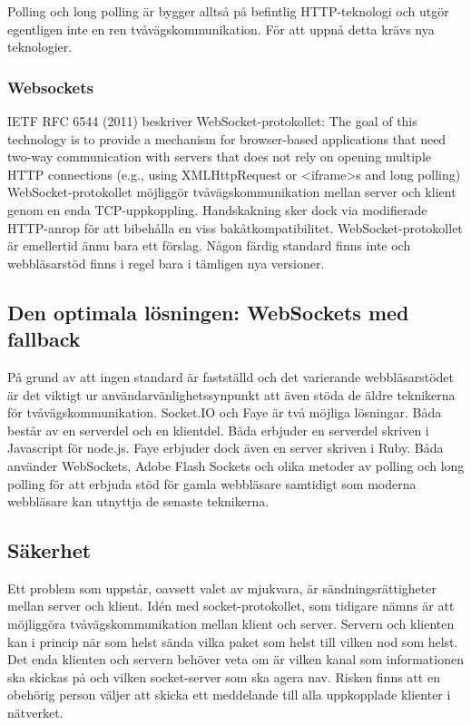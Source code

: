 Polling och long polling är bygger alltså på befintlig HTTP-teknologi och utgör egentligen inte en ren tvåvägskommunikation. För att uppnå detta krävs nya teknologier.

\subsubsection{Websockets}
IETF RFC 6544 (2011) beskriver WebSocket-protokollet:
The goal of this technology is to provide a mechanism for browser-based applications that need two-way communication with servers that does not rely on opening multiple HTTP connections (e.g., using XMLHttpRequest or <iframe>s and long polling)
WebSocket-protokollet möjliggör tvåvägskommunikation mellan server och klient genom en enda TCP-uppkoppling. Handskakning sker dock via modifierade HTTP-anrop för att bibehålla en viss bakåtkompatibilitet.
WebSocket-protokollet är emellertid ännu bara ett förslag. Någon färdig standard finns inte och webbläsarstöd finns i regel bara i tämligen nya versioner.

\subsection{Den optimala lösningen: WebSockets med fallback}
På grund av att ingen standard är fastställd och det varierande webbläsarstödet är det viktigt ur användarvänlighetssynpunkt att även stöda de äldre teknikerna för tvåvägskommunikation.
Socket.IO och Faye är två möjliga lösningar. Båda består av en serverdel och en klientdel. Båda erbjuder en serverdel skriven i Javascript för node.js. Faye erbjuder dock även en server skriven i Ruby.
Båda använder WebSockets, Adobe Flash Sockets och olika metoder av polling och long polling för att erbjuda stöd för gamla webbläsare samtidigt som moderna webbläsare kan utnyttja de senaste teknikerna.

\subsection{Säkerhet}
Ett problem som uppstår, oavsett valet av mjukvara, är sändningsrättigheter mellan server och klient. Idén med socket-protokollet, som tidigare nämns är att möjliggöra tvåvägskommunikation mellan klient och server. Servern och klienten kan i princip när som helst sända vilka paket som helst till vilken nod som helst. Det enda klienten och servern behöver veta om är vilken kanal som informationen ska skickas på och vilken socket-server som ska agera nav. Risken finns att en obehörig person väljer att skicka ett meddelande till alla uppkopplade klienter i nätverket.

